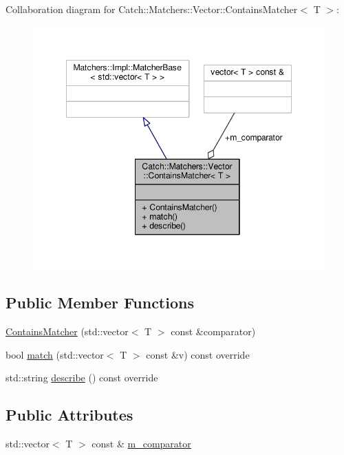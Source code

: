 Collaboration diagram for Catch\-:\-:Matchers\-:\-:Vector\-:\-:Contains\-Matcher$<$ T $>$\-:
\nopagebreak
\begin{figure}[H]
\begin{center}
\leavevmode
\includegraphics[width=348pt]{struct_catch_1_1_matchers_1_1_vector_1_1_contains_matcher__coll__graph}
\end{center}
\end{figure}
\subsection*{Public Member Functions}
\begin{DoxyCompactItemize}
\item 
\hyperlink{struct_catch_1_1_matchers_1_1_vector_1_1_contains_matcher_ad8e92c8399be6dce75bb5702cdfab700}{Contains\-Matcher} (std\-::vector$<$ T $>$ const \&comparator)
\item 
bool \hyperlink{struct_catch_1_1_matchers_1_1_vector_1_1_contains_matcher_afd33467ae48a41a634572b41b053f67f}{match} (std\-::vector$<$ T $>$ const \&v) const override
\item 
std\-::string \hyperlink{struct_catch_1_1_matchers_1_1_vector_1_1_contains_matcher_abe6a9ea3d6506c9a1f75ff524f35832e}{describe} () const override
\end{DoxyCompactItemize}
\subsection*{Public Attributes}
\begin{DoxyCompactItemize}
\item 
std\-::vector$<$ T $>$ const \& \hyperlink{struct_catch_1_1_matchers_1_1_vector_1_1_contains_matcher_a83d051166e4ed0d535219ad6ee99abb2}{m\-\_\-comparator}
\end{DoxyCompactItemize}


